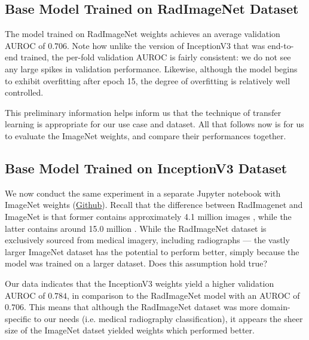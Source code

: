 \subsection{Base Model Trained on RadImageNet Dataset}

The model trained on RadImageNet weights achieves an average validation AUROC of \(0.706\). Note how unlike the version of InceptionV3 that was end-to-end trained, the per-fold validation AUROC is fairly consistent: we do not see any large spikes in validation performance. Likewise, although the model begins to exhibit overfitting after epoch 15, the degree of overfitting is relatively well controlled.



\noindent
This preliminary information helps inform us that the technique of transfer learning is appropriate for our use case and dataset. All that follows now is for us to evaluate the ImageNet weights, and compare their performances together.

\subsection{Base Model Trained on InceptionV3 Dataset}

We now conduct the same experiment in a separate Jupyter notebook with ImageNet weights (\href{https://github.com/ShenZhouHong/radiography-ai-project/blob/8d295305fbf9e8a7d1993e4564731e3f3f113f2d/python/initial-evaluation/inceptionv3-imagenet.ipynb}{Github}). Recall that the difference between RadImagenet and ImageNet is that former contains approximately 4.1 million images \autocite{radimagenet}, while the latter contains around 15.0 million \autocite{imagenet}. While the RadImageNet dataset is exclusively sourced from medical imagery, including radiographs --- the vastly larger ImageNet dataset has the potential to perform better, simply because the model was trained on a larger dataset. Does this assumption hold true?



\noindent
Our data indicates that the InceptionV3 weights yield a higher validation AUROC of \(0.784\), in comparison to the RadImageNet model with an AUROC of \(0.706\). This means that although the RadImageNet dataset was more domain-specific to our needs (i.e. medical radiography classification), it appears the sheer size of the ImageNet datset yielded weights which performed better.


